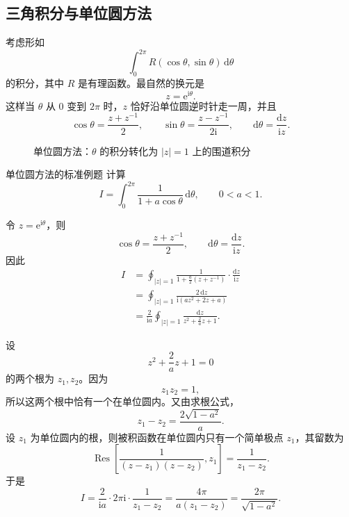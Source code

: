 \subsection{三角积分与单位圆方法}

考虑形如
\[
    \int_0^{2\pi} R(\cos\theta,\sin\theta)\,\mathrm{d}\theta
\]
的积分，其中 $R$ 是有理函数。最自然的换元是
\[
    z=\mathrm{e}^{\mathrm{i}\theta}.
\]
这样当 $\theta$ 从 $0$ 变到 $2\pi$ 时，$z$ 恰好沿单位圆逆时针走一周，并且
\[
    \cos\theta=\frac{z+z^{-1}}{2},\qquad
    \sin\theta=\frac{z-z^{-1}}{2\mathrm{i}},\qquad
    \mathrm{d}\theta=\frac{\mathrm{d}z}{\mathrm{i}z}.
\]

\begin{figure}[htbp]
\centering
{}
\caption{单位圆方法：$\theta$ 的积分转化为 $|z|=1$ 上的围道积分}
\label{fig:unit-circle-substitution}
\end{figure}

\begin{lizi}{单位圆方法的标准例题}{}
计算
\[
    I=\int_0^{2\pi}\frac{1}{1+a\cos\theta}\,\mathrm{d}\theta,
    \qquad 0<a<1.
\]

\begin{jie}
令 $z=\mathrm{e}^{\mathrm{i}\theta}$，则
\[
    \cos\theta=\frac{z+z^{-1}}{2},\qquad
    \mathrm{d}\theta=\frac{\mathrm{d}z}{\mathrm{i}z}.
\]
因此
\begin{align*}
    I
    &=
    \oint_{|z|=1}
    \frac{1}{1+\frac{a}{2}(z+z^{-1})}
    \cdot
    \frac{\mathrm{d}z}{\mathrm{i}z} \\
    &=
    \oint_{|z|=1}
    \frac{2\,\mathrm{d}z}{\mathrm{i}(az^2+2z+a)} \\
    &=
    \frac{2}{\mathrm{i}a}
    \oint_{|z|=1}
    \frac{\mathrm{d}z}{z^2+\frac{2}{a}z+1}.
\end{align*}

设
\[
    z^2+\frac{2}{a}z+1=0
\]
的两个根为 $z_1,z_2$。因为
\[
    z_1 z_2=1,
\]
所以这两个根中恰有一个在单位圆内。又由求根公式，
\[
    z_1-z_2=\frac{2\sqrt{1-a^2}}{a}.
\]
设 $z_1$ 为单位圆内的根，则被积函数在单位圆内只有一个简单极点 $z_1$，其留数为
\[
    \operatorname{Res}\left[\frac{1}{(z-z_1)(z-z_2)},z_1\right]
    =
    \frac{1}{z_1-z_2}.
\]
于是
\[
    I
    =
    \frac{2}{\mathrm{i}a}\cdot 2\pi \mathrm{i}\cdot \frac{1}{z_1-z_2}
    =
    \frac{4\pi}{a(z_1-z_2)}
    =
    \frac{2\pi}{\sqrt{1-a^2}}.
\]
\end{jie}
\end{lizi}

